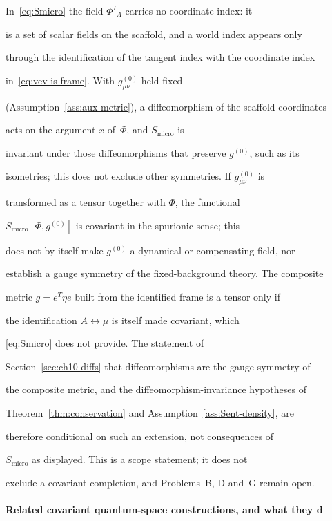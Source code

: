 In~\eqref{eq:Smicro} the field \(\Phi^I{}_A\) carries no coordinate index: it

is a set of scalar fields on the scaffold, and a world index appears only

through the identification of the tangent index with the coordinate index

in~\eqref{eq:vev-is-frame}. With \(g^{(0)}_{\mu\nu}\) held fixed

(Assumption~\ref{ass:aux-metric}), a diffeomorphism of the scaffold coordinates

acts on the argument \(x\) of~\(\Phi\), and \(S_{\mathrm{micro}}\) is

invariant under those diffeomorphisms that preserve \(g^{(0)}\), such as its

isometries; this does not exclude other symmetries. If \(g^{(0)}_{\mu\nu}\) is

transformed as a tensor together with \(\Phi\), the functional

\(S_{\mathrm{micro}}[\Phi,g^{(0)}]\) is covariant in the spurionic sense; this

does not by itself make \(g^{(0)}\) a dynamical or compensating field, nor

establish a gauge symmetry of the fixed-background theory. The composite

metric \(g=e^{T}\eta e\) built from the identified frame is a tensor only if

the identification \(A\leftrightarrow\mu\) is itself made covariant, which

\eqref{eq:Smicro} does not provide. The statement of

Section~\ref{sec:ch10-diffs} that diffeomorphisms are the gauge symmetry of

the composite metric, and the diffeomorphism-invariance hypotheses of

Theorem~\ref{thm:conservation} and Assumption~\ref{ass:Sent-density}, are

therefore conditional on such an extension, not consequences of

\(S_{\mathrm{micro}}\) as displayed. This is a scope statement; it does not

exclude a covariant completion, and Problems~B, D and~G remain open.





\paragraph{Related covariant quantum-space constructions, and what they d} \label{detail:sec-C-paragraphrelatedcovariantquant-16}

